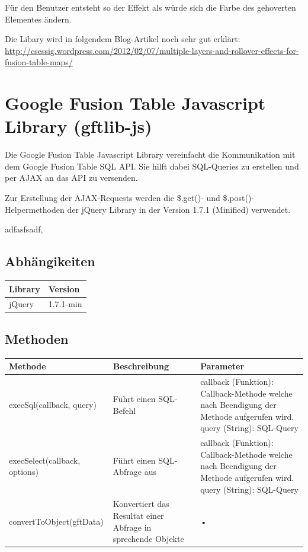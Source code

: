 Für den Benutzer entsteht so der Effekt als würde sich die Farbe des gehoverten Elementes ändern.

Die Libary wird in folgendem Blog-Artikel noch sehr gut erklärt: \url{http://csessig.wordpress.com/2012/02/07/multiple-layers-and-rollover-effects-for-fusion-table-maps/}

\section{Google Fusion Table Javascript Library (gftlib-js)}
\label{gftlib-js}
Die Google Fusion Table Javascript Library vereinfacht die Kommunikation mit dem Google Fusion Table SQL API. Sie hilft dabei SQL-Queries zu erstellen und per AJAX an das API zu versenden.

Zur Erstellung der AJAX-Requests werden die \$.get()- und \$.post()-Helpermethoden der jQuery Library in der Version 1.7.1 (Minified) verwendet.

adfasfsadf,

\subsection{Abhängikeiten}
\begin{tabular}{|l|l|}
\hline 
\textbf{Library} & \textbf{Version} \\ 
\hline 
jQuery & 1.7.1-min \\ 
\hline 
\end{tabular} 

\subsection{Methoden}
\begin{tabular}{|l|p{5cm}|p{5cm}|}
\hline 
\textbf{Methode} & \textbf{Beschreibung} & \textbf{Parameter} \\ 
\hline 
execSql(callback, query) & Führt einen SQL-Befehl & callback (Funktion): Callback-Methode welche nach Beendigung der Methode aufgerufen wird. query (String): SQL-Query \\ 
\hline 
execSelect(callback, options) & Führt einen SQL-Abfrage aus & callback (Funktion): Callback-Methode welche nach Beendigung der Methode aufgerufen wird. query (String): SQL-Query \\ 
\hline 
convertToObject(gftData) & Konvertiert das Resultat einer Abfrage in sprechende Objekte & • \\ 
\hline 
\end{tabular} 
